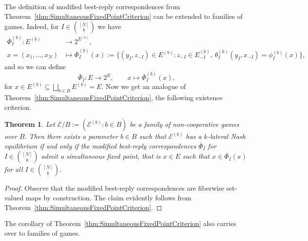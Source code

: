 \documentclass[a4paper,11pt,reqno,english]{amsart}
\theoremstyle{plain}
\newtheorem{theorem}{Theorem}[section]
\theoremstyle{definition}
\newcommand{\Ecal}{\mathcal{E}}
\begin{document}
\medskip
The definition of modified best-reply correspondences from Theorem~\ref{thm:SimultaneousFixedPointCriterion} can be extended to families of games.
Indeed, for $I\in\binom{[N]}{k}$ we have
\begin{align*}
	\overline{\Phi}_I^{(b)}\colon E^{(b)} & \longrightarrow 2^{E^{(b)}} ,                                                                                                                        & \\
	x = (x_1,\dots,x_N)                   & \longmapsto \overline{\Phi}_I^{(b)}(x):=\{(y_I, z_{-I})\in E^{(b)} \colon z_{-I}\in E^{(b)}_{-I}, \ \theta_I^{(b)}(y_I, x_{-I}) = \phi_I^{(b)}(x)\}, &
\end{align*}
and so we can define
\begin{displaymath}
	\overline{\Phi}_I\colon E\longrightarrow 2^{E}, \qquad x \longmapsto \overline{\Phi}_I^{(b)}(x),
\end{displaymath}
for $x\in E^{(b)} \subseteq \bigsqcup_{b\in B}E^{(b)} = E$.
Now we get an analogue of Theorem~\ref{thm:SimultaneousFixedPointCriterion}, the following existence criterion.

\begin{theorem}\label{thm:FamilyOfGamesSimultaneousFixedPointCriterion}
	Let $\Ecal/B:=(\Ecal^{(b)}:b\in B)$ be a family of non-cooperative games over $B$.
	Then there exists a parameter $b\in B$ such that $\Ecal^{(b)}$ has a $k$-lateral Nash equilibrium if and only if the modified best-reply correspondences $\overline{\Phi}_I$ for $I\in\binom{[N]}{k}$ admit a simultaneous fixed point, that is $x\in E$ such that $x\in\overline{\Phi}_I(x)$ for all $I\in\binom{[N]}{k}$.
\end{theorem}
\begin{proof}
	Observe that the modified best-reply correspondences are fiberwise set-valued maps by construction.
	The claim evidently follows from Theorem~\ref{thm:SimultaneousFixedPointCriterion}.
\end{proof}

 
\medskip
The corollary of Theorem~\ref{thm:SimultaneousFixedPointCriterion} also carries over to families of games.
\end{document}
